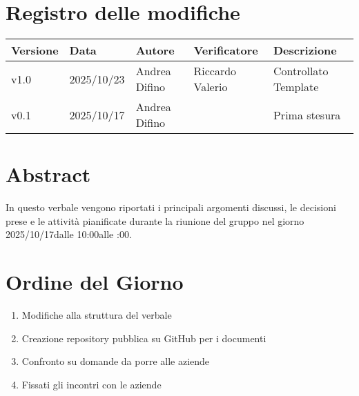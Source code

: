 \documentclass[a4paper,12pt]{article}
\newcommand{\DataVerbale}{2025/10/17}
\newcommand{\OraInizio}{10:00}
\newcommand{\OraFine}{12:00}
\newcommand{\AbstractVerbale}{%
In questo verbale vengono riportati i principali argomenti discussi, le decisioni prese e le attività pianificate durante la riunione del gruppo nel giorno \DataVerbale \space dalle \OraInizio \space alle \space \OraFine .
}
\newcommand{\VersioneVerbale}{v1.0} %
\begin{document}
\section*{Registro delle modifiche}{
    \begin{center} 
        \begin{tabular}{|l|l|l|l|l|}
            \hline
            \textbf{Versione} & \textbf{Data} & \textbf{Autore} & \textbf{Verificatore} & \textbf{Descrizione} \\
            \hline
            \VersioneVerbale & 2025/10/23 & Andrea Difino & Riccardo Valerio & Controllato Template\\
            \hline
            v0.1 & \DataVerbale & Andrea Difino & & Prima stesura\\
            \hline
        \end{tabular}
    \end{center}
}

\newpage

\tableofcontents

\newpage
\section{Abstract}{
    \begin{minipage}{0.9\textwidth}
        \small
        \AbstractVerbale
    \end{minipage}
}


\section{Ordine del Giorno}{
    \begin{enumerate}
        \item Modifiche alla struttura del verbale
        \item Creazione repository pubblica su GitHub per i documenti
        \item Confronto su domande da porre alle aziende
        \item Fissati gli incontri con le aziende
    \end{enumerate}
}
\end{document}
